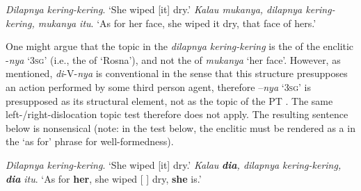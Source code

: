 \documentclass[output=paper
,modfonts
,nonflat]{langsci/langscibook}
\begin{document}
\begin{exe}
	\ex\label{e:djenar:30}
	\begin{xlist}
		\ex \textit{Dilapnya kering-kering}.
		\glt ‘She wiped [it] dry.’
		\ex \textit{Kalau mukanya, dilapnya kering-kering, mukanya itu}.
		\glt ‘As for her face, she wiped it dry, that face of hers.’
	\end{xlist}
\end{exe}

\noindent
One might argue that the topic in the  \textit{dilapnya kering-kering} is the  of the enclitic -\textit{nya} ‘\textsc{3sg}’ (i.e., the  of ‘Rosna’), and not the  of \textit{mukanya} ‘her face’. However, as mentioned, \textit{di}-V-\textit{nya} is conventional in the sense that this structure presupposes an action performed by some third person agent, therefore –\textit{nya} ‘\textsc{3sg}’ is presupposed as its structural element, not as the topic of the PT . The same left-/right-dislocation topic test therefore does not apply. The resulting sentence below is nonsensical (note: in the test below, the enclitic must be rendered as a  in the ‘as for’ phrase for well-formedness).

\begin{exe}
	\ex\label{e:djenar:31}
	\begin{xlist}
		\ex \textit{Dilapnya kering-kering}. 
		\glt ‘She wiped [it] dry.’
		\ex \textit{Kalau} \textbf{\textit{dia}}\textit{, dilapnya kering-kering,} \textbf{\textit{dia}} \textit{itu}. 
		\glt ‘As for \textbf{her}, she wiped [ ] dry, \textbf{she} is.’
	\end{xlist}
\end{exe}
\end{document}
